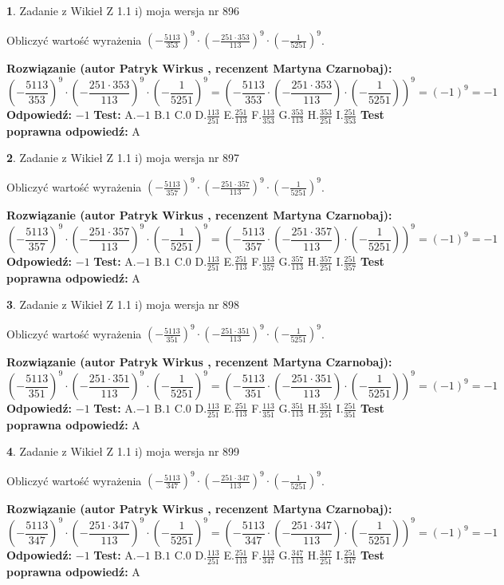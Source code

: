 \documentclass[12pt, a4paper]{article}
\theoremstyle{definition} %
\newtheorem{zad}{}
\newcommand{\zadStart}[1]{\begin{zad}#1\newline}
\newcommand{\zadStop}{\end{zad}}
\newcommand{\rozwStart}[2]{\noindent \textbf{Rozwiązanie (autor #1 , recenzent #2): }\newline}
\newcommand{\rozwStop}{\newline}
\newcommand{\odpStart}{\noindent \textbf{Odpowiedź:}\newline}
\newcommand{\odpStop}{\newline}
\newcommand{\testStart}{\noindent \textbf{Test:}\newline}
\newcommand{\testStop}{\newline}
\newcommand{\kluczStart}{\noindent \textbf{Test poprawna odpowiedź:}\newline}
\newcommand{\kluczStop}{\newline}
\begin{document}
\zadStart{Zadanie z Wikieł Z 1.1 i) moja wersja nr 896}

Obliczyć wartość wyrażenia $(-\frac{5113}{353})^{9} \cdot (-\frac{251 \cdot 353}{113})^{9} \cdot (-\frac{1}{5251})^{9}$.
\zadStop
\rozwStart{Patryk Wirkus}{Martyna Czarnobaj}
$$(-\frac{5113}{353})^{9} \cdot (-\frac{251 \cdot 353}{113})^{9} \cdot (-\frac{1}{5251})^{9} = (-\frac{5113}{353} \cdot (-\frac{251 \cdot 353}{113}) \cdot (-\frac{1}{5251}))^{9} = (-1)^{9} = -1$$
\rozwStop
\odpStart
$-1$
\odpStop
\testStart
A.$-1$ B.$1$ C.$0$ D.$\frac{113}{251}$ E.$\frac{251}{113}$
F.$\frac{113}{353}$ G.$\frac{353}{113}$
H.$\frac{353}{251}$
I.$\frac{251}{353}$
\testStop
\kluczStart
A
\kluczStop



\zadStart{Zadanie z Wikieł Z 1.1 i) moja wersja nr 897}

Obliczyć wartość wyrażenia $(-\frac{5113}{357})^{9} \cdot (-\frac{251 \cdot 357}{113})^{9} \cdot (-\frac{1}{5251})^{9}$.
\zadStop
\rozwStart{Patryk Wirkus}{Martyna Czarnobaj}
$$(-\frac{5113}{357})^{9} \cdot (-\frac{251 \cdot 357}{113})^{9} \cdot (-\frac{1}{5251})^{9} = (-\frac{5113}{357} \cdot (-\frac{251 \cdot 357}{113}) \cdot (-\frac{1}{5251}))^{9} = (-1)^{9} = -1$$
\rozwStop
\odpStart
$-1$
\odpStop
\testStart
A.$-1$ B.$1$ C.$0$ D.$\frac{113}{251}$ E.$\frac{251}{113}$
F.$\frac{113}{357}$ G.$\frac{357}{113}$
H.$\frac{357}{251}$
I.$\frac{251}{357}$
\testStop
\kluczStart
A
\kluczStop



\zadStart{Zadanie z Wikieł Z 1.1 i) moja wersja nr 898}

Obliczyć wartość wyrażenia $(-\frac{5113}{351})^{9} \cdot (-\frac{251 \cdot 351}{113})^{9} \cdot (-\frac{1}{5251})^{9}$.
\zadStop
\rozwStart{Patryk Wirkus}{Martyna Czarnobaj}
$$(-\frac{5113}{351})^{9} \cdot (-\frac{251 \cdot 351}{113})^{9} \cdot (-\frac{1}{5251})^{9} = (-\frac{5113}{351} \cdot (-\frac{251 \cdot 351}{113}) \cdot (-\frac{1}{5251}))^{9} = (-1)^{9} = -1$$
\rozwStop
\odpStart
$-1$
\odpStop
\testStart
A.$-1$ B.$1$ C.$0$ D.$\frac{113}{251}$ E.$\frac{251}{113}$
F.$\frac{113}{351}$ G.$\frac{351}{113}$
H.$\frac{351}{251}$
I.$\frac{251}{351}$
\testStop
\kluczStart
A
\kluczStop



\zadStart{Zadanie z Wikieł Z 1.1 i) moja wersja nr 899}

Obliczyć wartość wyrażenia $(-\frac{5113}{347})^{9} \cdot (-\frac{251 \cdot 347}{113})^{9} \cdot (-\frac{1}{5251})^{9}$.
\zadStop
\rozwStart{Patryk Wirkus}{Martyna Czarnobaj}
$$(-\frac{5113}{347})^{9} \cdot (-\frac{251 \cdot 347}{113})^{9} \cdot (-\frac{1}{5251})^{9} = (-\frac{5113}{347} \cdot (-\frac{251 \cdot 347}{113}) \cdot (-\frac{1}{5251}))^{9} = (-1)^{9} = -1$$
\rozwStop
\odpStart
$-1$
\odpStop
\testStart
A.$-1$ B.$1$ C.$0$ D.$\frac{113}{251}$ E.$\frac{251}{113}$
F.$\frac{113}{347}$ G.$\frac{347}{113}$
H.$\frac{347}{251}$
I.$\frac{251}{347}$
\testStop
\kluczStart
A
\kluczStop
\end{document}
